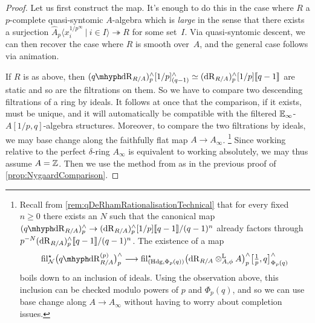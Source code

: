 \documentclass[DIV=12,numbers=enddot,leqno,bibliography=totoc]{scrartcl}
\begin{document}
	\begin{proof}
		Let us first construct the map. It's enough to do this in the case where $R$ a $p$-complete quasi-syntomic $A$-algebra which is \emph{large} in the sense that there exists a surjection $\widehat{A}_p\langle x_i^{1/p^\infty}\ |\ i\in I\rangle \twoheadrightarrow R$ for some set~$I$. Via quasi-syntomic descent, we can then recover the case where $R$ is smooth over~$A$, and the general case follows via animation.
		
		If $R$ is as above, then $(\qdeRham_{R/A})_p^\complete[1/p]_{(q-1)}^\complete\simeq (\deRham_{R/A})_p^\complete[1/p]\qpower$ are static and so are the filtrations on them. So we have to compare two descending filtrations of a ring by ideals. It follows at once that the comparison, if it exists, must be unique, and it will automatically be compatible with the filtered $\mathbb{E}_\infty$-$A[1/p,q]$-algebra structures. Moreover, to compare the two filtrations by ideals, we may base change along the faithfully flat map $A\rightarrow A_\infty$.%
		\footnote{Recall from \cref{rem:qDeRhamRationalisationTechnical} that for every fixed $n\geqslant 0$ there exists an $N$ such that the canonical map $(\qdeRham_{R/A})_p^\complete\rightarrow (\deRham_{R/A})_p^\complete[1/p]\qpower/(q-1)^n$ already factors through $p^{-N}(\mathrm{dR}_{R/A})_p^\wedge\llbracket q-1\rrbracket/(q-1)^n$. The existence of a map
			\begin{equation*}
				\fil_\Nn^\star \bigl(\qdeRham_{R/A}^{(p)}\bigr)_p^\complete\longrightarrow	 \fil_{(\Hodge,\Phi_p(q))}^\star \bigl(\deRham_{R/A}\lotimes_{A,\phi}A\bigr)_p^\complete\bigl[\localise{p},q\bigr]_{\Phi_p(q)}^\complete
			\end{equation*}	
			boils down to an inclusion of ideals. Using the observation above, this inclusion can be checked modulo powers of $p$ and $\Phi_p(q)$, and so we can use base change along $A\rightarrow A_\infty$ without having to worry about completion issues.}
		Since working relative to the perfect $\delta$-ring $A_\infty$ is equivalent to working absolutely, we may thus assume $A=\mathbb{Z}$. Then we use the method from \cite[\S{}]{Prismatic} as in the previous proof of \cref{prop:NygaardComparison}.
		

\end{proof}
\end{document}
